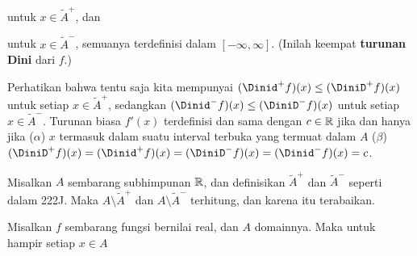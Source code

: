 
\noindent untuk $x\in\tilde A^+$, dan



\noindent untuk $x\in\tilde A^-$, semuanya terdefinisi dalam
$[-\infty,\infty]$. (Inilah keempat {\bf turunan Dini} dari
$f$.)

Perhatikan bahwa tentu saja kita mempunyai
$(\Dinid^+f)(x)\le(\DiniD^+f)(x)$ untuk setiap $x\in\tilde A^+$,
sedangkan $(\Dinid^-f)(x)\le(\DiniD^-f)(x)$ untuk setiap
$x\in\tilde A^-$. Turunan biasa $f'(x)$ terdefinisi dan sama dengan
$c\in\Bbb R$ jika dan hanya jika ($\alpha$) $x$ termasuk dalam suatu
interval terbuka yang termuat dalam $A$ ($\beta$)
$(\DiniD^+f)(x)=(\Dinid^+f)(x)=(\DiniD^-f)(x)
=(\Dinid^-f)(x)=c$.

 Misalkan $A$ sembarang subhimpunan $\Bbb R$, dan
definisikan $\tilde A^+$ dan $\tilde A^-$ seperti dalam 222J. Maka
$A\setminus\tilde A^+$ dan $A\setminus\tilde A^-$ terhitung, dan karena
itu terabaikan.


 Misalkan $f$ sembarang fungsi bernilai real, dan $A$
domainnya. Maka untuk hampir setiap $x\in A$

